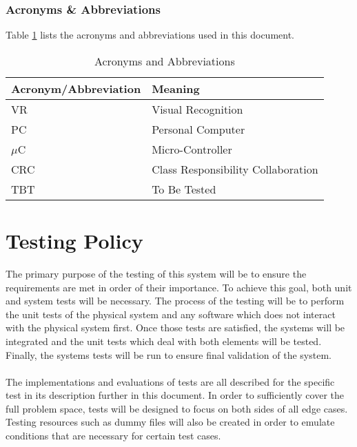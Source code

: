 \documentclass[titlepage]{article}
\begin{document}
\subsubsection{Acronyms \& Abbreviations}
Table \ref{tab:Acronyms} lists the acronyms and abbreviations used in this document.
\begin{table}[h!]
\centering
\begin{tabular}{| p{6cm} | p{6cm} |}\hline
	\textbf{Acronym/Abbreviation}	&\textbf{Meaning}\\\hline
	VR								&Visual Recognition\\\hline
	PC								&Personal Computer\\\hline
	$\mu$C							&Micro-Controller\\\hline
	CRC								&Class Responsibility Collaboration\\\hline
	TBT								&To Be Tested\\\hline
\end{tabular}
\caption{Acronyms and Abbreviations}
\label{tab:Acronyms}
\end{table}
\newpage



\section{Testing Policy}
The primary purpose of the testing of this system will be to ensure the requirements are met in order of their importance. To achieve this goal, both unit and system tests will be necessary. The process of the testing will be to perform the unit tests of the physical system and any software which does not interact with the physical system first. Once those tests are satisfied, the systems will be integrated and the unit tests which deal with both elements will be tested. Finally, the systems tests will be run to ensure final validation of the system.\\~\\
The implementations and evaluations of tests are all described for the specific test in its description further in this document. In order to sufficiently cover the full problem space, tests will be designed to focus on both sides of all edge cases. Testing resources such as dummy files will also be created in order to emulate conditions that are necessary for certain test cases.
\end{document}
